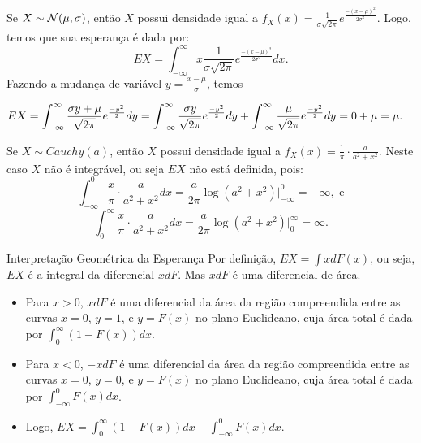 %
\begin{frame}
\begin{exem}[Normal]
%
Se $X\sim {\cal N}(\mu,\sigma)$, então $X$ possui densidade igual a $f_X(x)=\frac{1}{\sigma\sqrt{2\pi}}e^{\frac{-(x-\mu)^2}{2\sigma^2}}$. Logo, temos
que sua esperança é dada por:
$$EX=\int_{-\infty}^{\infty}x\frac{1}{\sigma\sqrt{2\pi}}e^{\frac{-(x-\mu)^2}{2\sigma^2}}dx.$$
Fazendo a mudança de variável $y=\frac{x-\mu}{\sigma}$, temos

\begin{eqnarray}
\hspace{-0.7cm} & & EX=\int_{-\infty}^{\infty}\frac{\sigma y +\mu}{\sqrt{2\pi}}e^{\frac{-y^2}{2}}dy
\nonumber  =\int_{-\infty}^{\infty}\frac{\sigma y }{\sqrt{2\pi}}e^{\frac{-y^2}{2}}dy+\int_{-\infty}^{\infty}\frac{\mu}{\sqrt{2\pi}}e^{\frac{-y^2}{2}}dy=0+\mu=\mu.\nonumber
\end{eqnarray}
%
\end{exem}
%
\begin{exem}[Cauchy]
%
Se $X\sim Cauchy(a)$, então $X$ possui densidade igual a $f_X(x)=\frac{1}{\pi}\cdot\frac{a}{a^2+x^2}$. Neste caso $X$ não é integrável, ou seja $EX$ não está definida, pois:
$$\int_{-\infty}^{0}\frac{x}{\pi}\cdot\frac{a}{a^2+x^2}dx=\frac{a}{2\pi}\log(a^2+x^2)|_{-\infty}^{0}=-\infty, \mbox{ e}$$
$$\int_{0}^{\infty}\frac{x}{\pi}\cdot\frac{a}{a^2+x^2}dx=\frac{a}{2\pi}\log(a^2+x^2)|_{0}^{\infty}=\infty.$$

\end{exem}
\end{frame}
%
\begin{frame}
\begin{block}{Interpretação Geométrica da Esperança}
%
%
Por definição, $EX=\int xdF(x)$, ou seja, $EX$ é a integral da diferencial $xdF$. Mas $xdF$ é uma diferencial de área. \begin{itemize}
\item Para $x>0$, $xdF$ é uma diferencial da área da região compreendida entre as curvas $x=0$, $y=1$, e $y=F(x)$ no plano Euclideano, cuja área total é dada por $\int_{0}^{\infty}(1-F(x))dx$.
\item Para $x<0$, $-xdF$ é uma diferencial da área da região compreendida entre as curvas $x=0$, $y=0$, e $y=F(x)$ no plano Euclideano, cuja área total é dada por $\int_{-\infty}^{0}F(x)dx$.
\item Logo, $EX=\int_{0}^{\infty}(1-F(x))dx-\int_{-\infty}^{0}F(x)dx$.
\end{itemize}
%
\end{block}
\end{frame}
